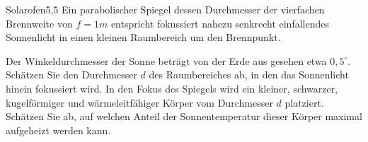 \begin{problem}{Solarofen}{5,5}
Ein parabolischer Spiegel dessen Durchmesser der vierfachen Brennweite von $f=1\unit{m}$ entspricht fokussiert nahezu senkrecht einfallendes Sonnenlicht in einen kleinen Raumbereich um den Brennpunkt.

\begin{abcenum}
  \item Der Winkeldurchmesser der Sonne beträgt von der Erde aus gesehen etwa $0,5^{\circ}$.  Schätzen Sie den Durchmesser $d$ des Raumbereiches ab, in den das Sonnenlicht hinein fokussiert wird.
  \itme In den Fokus des Spiegels wird ein kleiner, schwarzer, kugelförmiger und wärmeleitfähiger Körper vom Durchmesser $d$ platziert.  Schätzen Sie ab, auf welchen Anteil der Sonnentemperatur dieser Körper maximal aufgeheizt werden kann.
\end{abcenum}

  \begin{solution}
    
  \end{solution}
\end{problem}

